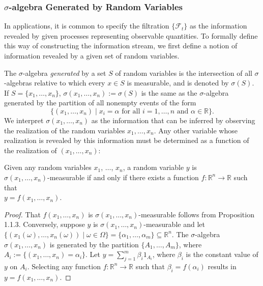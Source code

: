 \documentclass[\topdir/lecture\_notes.tex]{subfiles}
\begin{document}
\subsubsection{$\sigma$-algebra Generated by Random Variables}
In applications, it is common to specify the filtration $\{\mathcal{F}_{t}\}$ as the information revealed by given processes representing observable quantities. To formally define this way of constructing the information stream, we first define a notion of information revealed by a given set of random variables.

The $\sigma$-algebra \emph{generated} by a set $S$ of random variables is the intersection of all $\sigma$-algebras relative to which every $x \in S$ is measurable, and is denoted by $\sigma(S)$. If $S=\{x_{1}, \ldots, x_{n}\}$, $\sigma(x_{1}, \ldots, x_{n}) := \sigma(S)$ is the same as the $\sigma$-algebra generated by the partition of all nonempty events of the form 
\[
    \{(x_{1}, \ldots, x_{n}) \mid x_i = \alpha \text{ for all }i=1,\ldots,n \text{ and } \alpha \in \mathbb{R}\}.
\]
We interpret $\sigma(x_{1}, \ldots, x_{n})$ as the information that can be inferred by observing the realization of the random variables $x_{1}, \ldots, x_{n}$. Any other variable whose realization is revealed by this information must be determined as a function of the realization of $(x_{1}, \ldots, x_{n})$:

\begin{proposition} \label{prop:measurable_function_characterization}
Given any random variables $x_{1}$, $\ldots$, $x_{n}$, a random variable $y$ is \\
$\sigma(x_{1},\ldots, x_{n})$-measurable if and only if there exists a function $f: \mathbb{R}^{n} \rightarrow \mathbb{R}$ such that \\
$y=f(x_{1}, \ldots, x_{n})$.
\end{proposition}
\begin{proof}
That $f(x_{1}, \ldots, x_{n})$ is $\sigma(x_{1}, \ldots, x_{n})$-measurable follows from Proposition 1.1.3. Conversely, suppose $y$ is $\sigma(x_{1}, \ldots, x_{n})$-measurable and let $\{(x_{1}(\omega), \ldots, x_{n}(\omega)) \mid \omega \in \Omega\}=\{\alpha_{1}, \ldots, \alpha_{m}\} \subseteq \mathbb{R}^{n}$. The $\sigma$-algebra $\sigma(x_{1}, \ldots, x_{n})$ is generated by the partition $\{A_{1}, \ldots, A_{m}\}$, where
$A_{i} :=\{(x_{1}, \ldots, x_{n})=\alpha_{i}\}$. Let $y=\sum_{j=1}^{m} \beta_{i} 1_{A_{i}}$, where $\beta_{i}$ is the constant value of $y$ on $A_{i}$. Selecting any function $f: \mathbb{R}^{n} \rightarrow \mathbb{R}$ such that $\beta_{i}=f(\alpha_{i})$ results in $y=f(x_{1}, \ldots, x_{n})$.
\end{proof}
\end{document}
